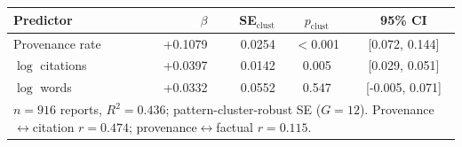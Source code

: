 \begin{tabular}{lrrcc}
\toprule
Predictor & $\beta$ & SE$_{\mathrm{clust}}$ & $p_{\mathrm{clust}}$ & 95\% CI\\
\midrule
Provenance rate & +0.1079 & 0.0254 & $<$0.001 & [0.072, 0.144] \\
$\log$ citations & +0.0397 & 0.0142 & 0.005 & [0.029, 0.051] \\
$\log$ words & +0.0332 & 0.0552 & 0.547 & [-0.005, 0.071] \\
\midrule
\multicolumn{5}{l}{\footnotesize $n=916$ reports, $R^2=0.436$; pattern-cluster-robust SE ($G{=}12$). Provenance$\leftrightarrow$citation $r=0.474$; provenance$\leftrightarrow$factual $r=0.115$.} \\
\bottomrule
\end{tabular}